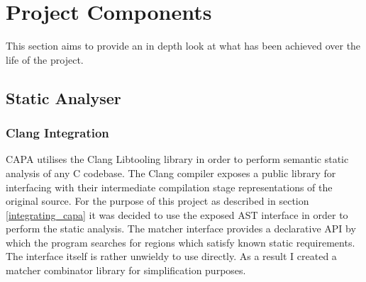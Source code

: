 
\section{Project Components}

This section aims to provide an in depth look at what has been achieved over the life of the
project.

\subsection{Static Analyser}

\subsubsection{Clang Integration}
CAPA utilises the Clang Libtooling library in order to perform semantic static analysis of any C
codebase. The Clang compiler exposes a public library for interfacing with their intermediate
compilation stage representations of the original source. For the purpose of this project as
described in section \ref{integrating_capa} it was decided to use the exposed AST interface in order
to perform the static analysis. The matcher interface provides a declarative API by which the
program searches for regions which satisfy known static requirements. The interface itself is rather
unwieldy to use directly.   As a result I created a matcher
combinator library for simplification purposes.

